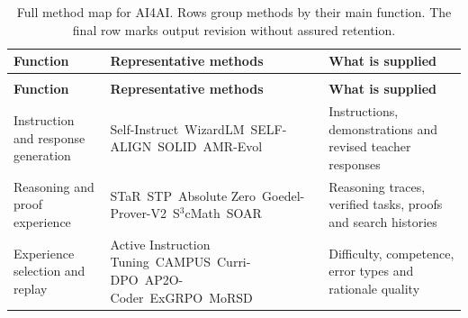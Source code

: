 \begingroup
\small
\renewcommand{\arraystretch}{1.15}
\setlength{\tabcolsep}{4pt}
\begin{longtable}{@{}>{\raggedright\arraybackslash}p{}>{\raggedright\arraybackslash}p{}>{\raggedright\arraybackslash}p{}@{}}
\caption{Full method map for AI4AI. Rows group methods by their main function. The final row marks output revision without assured retention.}\label{tab:full-landscape}\\
\toprule
\textbf{Function} & \textbf{Representative methods} & \textbf{What is supplied} \\
\midrule
\endfirsthead
\multicolumn{3}{l}{\tablename\ \thetable\ continued}\\
\toprule
\textbf{Function} & \textbf{Representative methods} & \textbf{What is supplied} \\
\midrule
\endhead
\bottomrule
\endfoot
Instruction and response generation & Self-Instruct~\citep{wang-etal-2023-self-instruct}\newline WizardLM~\citep{xu2024wizardlm}\newline SELF-ALIGN~\citep{DBLP:conf/nips/SunSZZCCYG23}\newline SOLID~\citep{askari-etal-2025-solid}\newline AMR-Evol~\citep{luo-etal-2024-amr} & Instructions, demonstrations and revised teacher responses \\
\addlinespace[8pt]
Reasoning and proof experience & STaR~\citep{zelikman2022star}\newline STP~\citep{dong2025stp}\newline Absolute Zero~\citep{zhao2025absolute}\newline Goedel-Prover-V2~\citep{lin2026goedelproverv}\newline S$^3$cMath~\citep{Yan20253cmath}\newline SOAR~\citep{pourcel2025selfimproving} & Reasoning traces, verified tasks, proofs and search histories \\
\addlinespace[8pt]
Experience selection and replay & Active Instruction Tuning~\citep{kung-etal-2023-active}\newline CAMPUS~\citep{li-etal-2025-teaching}\newline Curri-DPO~\citep{pattnaik-etal-2024-enhancing}\newline AP2O-Coder~\citep{Zhang2026ap2o}\newline ExGRPO~\citep{zhan2026exgrpo}\newline MoRSD~\citep{yan-etal-2025-towards} & Difficulty, competence, error types and rationale quality \\

\end{longtable}
